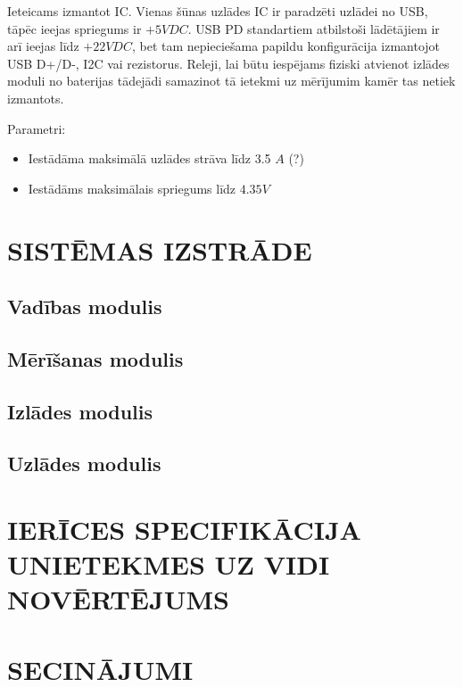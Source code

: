 \documentclass[12pt,fleqn,titlepage,oneside]{article}
\begin{document}
Ieteicams izmantot IC. Vienas šūnas uzlādes IC ir paradzēti uzlādei no USB, tāpēc ieejas spriegums ir $+5VDC$. USB PD standartiem atbilstoši lādētājiem ir arī ieejas līdz $+22VDC$, bet tam nepieciešama papildu konfigurācija izmantojot USB D+/D-, I2C vai rezistorus. Releji, lai būtu iespējams fiziski atvienot izlādes moduli no baterijas tādejādi samazinot tā ietekmi uz mērījumim kamēr tas netiek izmantots.

Parametri:
\begin{itemize}
	\item Iestādāma maksimālā uzlādes strāva līdz 3.5 $A$ (?) %
	\item Iestādāms maksimālais spriegums līdz $4.35 V$
\end{itemize}


\FloatBarrier
\newpage
\section{\texorpdfstring{\MakeUppercase{Sistēmas izstrāde}}{Sistēmas izstrāde}}

\subsection{Vadības modulis}

\subsection{Mērīšanas modulis}

\subsection{Izlādes modulis}

\subsection{Uzlādes modulis}

\FloatBarrier
\newpage
\section{\texorpdfstring{\MakeUppercase{Ierīces specifikācija un\newline ietekmes uz vidi novērtējums}}{Ierīces specifikācija un ietekmes uz vidi novērtējums}}


\FloatBarrier
\newpage
\section{\texorpdfstring{\MakeUppercase{Secinājumi}}{Secinājumi}}
\end{document}
